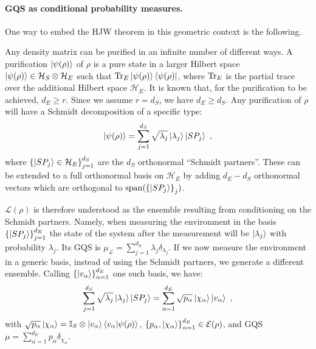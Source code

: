 \documentclass[draft,nofootinbib,pre,twocolumn,showpacs,showkeys,groupaddress,preprintnumbers,floatfix]{revtex4-1}
\newcommand{\1}{\mathbbm{1}}
\begin{document}
\paragraph*{GQS as conditional probability measures.}

One way to embed the HJW theorem in this geometric context is the following. 

Any density matrix can be purified in an infinite number of different ways. A purification $\ket{\psi(\rho)}$ of $\rho$ is a pure state in a larger Hilbert space $\ket{\psi(\rho)} \in \mathcal{H}_S \otimes \mathcal{H}_E$ such that $\Tr_{E}\ket{\psi(\rho)}\bra{\psi(\rho)}$, where $\Tr_E$ is the partial trace over the additional Hilbert space $\mathcal{H}_E$. It is known that, for the purification to be achieved, $d_E \geq r$. Since we assume $r = d_S$, we have $d_E \geq d_S$. Any purification of $\rho$ will have a Schmidt decomposition of a specific type:
\begin{align*}
\ket{\psi(\rho)} = \sum_{j=1}^{d_S} \sqrt{\lambda_j} \ket{\lambda_j}\ket{SP_j}
  ~,
\end{align*}
where $\left\{\ket{SP_j} \in \mathcal{H}_E\right\}_{j=1}^{d_S}$ are the $d_S$
orthonormal ``Schmidt partners''. These can be extended to a full orthonormal basis 
on $\mathcal{H}_E$ by adding $d_E - d_S$ orthonormal vectors which are orthogonal 
to $\mathrm{span}(\left\{ \ket{SP_j}\right\}_j)$.

$\mathcal{L}(\rho)$ is therefore understood as the ensemble resulting from
conditioning on the Schmidt partners. Namely, when measuring the environment in
the basis $\left\{ \ket{SP_j}\right\}_{j=1}^{d_E}$ the state of the system after the measurement 
will be $\ket{\lambda_j}$ with probability $\lambda_j$. Its GQS is $\mu_{\mathcal{L}} = \sum_{j=1}^{d_S}\lambda_j \delta_{\lambda_j}$. 
If we now measure the environment in a generic basis, instead of using the Schmidt
partners, we generate a different ensemble. Calling
$\left\{\ket{v_\alpha}\right\}_{\alpha=1}^{d_E}$ one such basis, we have: 
\begin{align*}
\sum_{j=1}^{d_S} \sqrt{\lambda_j} \ket{\lambda_j}\ket{SP_j} = \sum_{\alpha=1}^{d_E} \sqrt{p_\alpha}\ket{\chi_\alpha} \ket{v_\alpha}
  ~,
\end{align*}
with $\sqrt{p_\alpha}\ket{\chi_\alpha} = \mathbb{I}_S \otimes \ket{v_\alpha}\bra{v_\alpha} \ket{\psi(\rho)}$, 
$\left\{ p_\alpha,\ket{\chi_\alpha}\right\}_{\alpha=1}^{d_E} \in
\mathcal{E}(\rho)$, and GQS $\mu = \sum_{\alpha=1}^{d_E} p_\alpha
\delta_{\chi_\alpha}$. 
\end{document}
